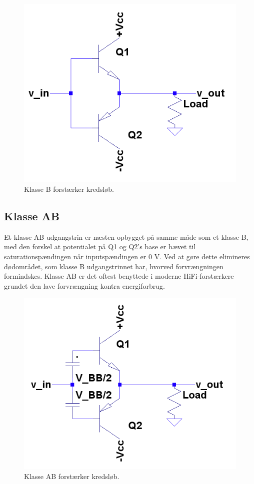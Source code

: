 \begin{figure}[h]
\centering
\includegraphics[scale=.35]{indledende_analyse/klasser/classb.png}
\caption{Klasse B forstærker kredsløb.}
\label{fig:classb}
\end{figure}

\subsection{Klasse AB}

Et klasse AB udgangstrin er næsten opbygget på samme måde som et klasse B, med den forskel at potentialet på Q1 og Q2's base er hævet til saturationspændingen når inputspændingen er 0 V. Ved at gøre dette elimineres dødområdet, som klasse B udgangstrinnet har, hvorved forvrængningen formindskes. 
Klasse AB er det oftest benyttede i moderne HiFi-forstærkere grundet den lave forvrængning kontra energiforbrug. 

\begin{figure}[h]
\centering
\includegraphics[scale=.35]{indledende_analyse/klasser/classab.png}
\caption{Klasse AB forstærker kredsløb.}
\label{fig:classab}
\end{figure}

